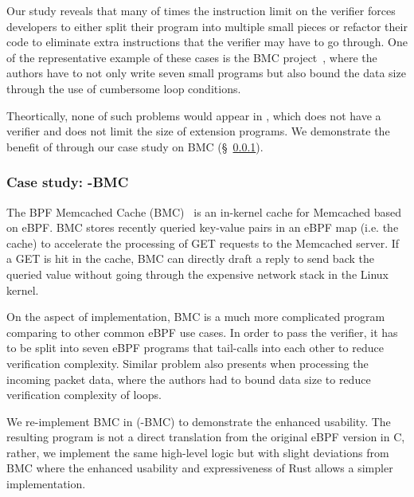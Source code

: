 Our study reveals that many of times the instruction limit on the verifier
    forces developers to either split their program into multiple small pieces
    or refactor their code to eliminate extra instructions that the verifier
    may have to go through.
One of the representative example of these cases is the BMC project~\cite{BMC},
    where the authors have to not only write seven small programs but also
    bound the data size through the use of cumbersome loop conditions.

Theortically, none of such problems would appear in \projname{}, which does not
    have a verifier and does not limit the size of extension programs.
We demonstrate the benefit of \projname{} through our case study on BMC
    (\S~\ref{eval:bmc-case-study}).

\subsubsection{Case study: \projname{}-BMC}
\label{eval:bmc-case-study}
The BPF Memcached Cache (BMC)~\cite{BMC} is an in-kernel cache for Memcached
    based on eBPF.
BMC stores recently queried key-value pairs in an eBPF map (i.e. the cache) to
    accelerate the processing of GET requests to the Memcached server.
If a GET is hit in the cache, BMC can directly draft a reply to send back the
    queried value without going through the expensive network stack in the
    Linux kernel.

On the aspect of implementation, BMC is a much more complicated program
    comparing to other common eBPF use cases.
In order to pass the verifier, it has to be split into seven
    eBPF programs that tail-calls into each other to reduce verification
    complexity.
Similar problem also presents when processing the incoming packet data, where
    the authors had to bound data size to reduce verification complexity of
    loops.

We re-implement BMC in \projname{} (\projname{}-BMC) to demonstrate the
    enhanced usability.
The resulting program is not a direct translation from the original eBPF
    version in C, rather, we implement the same high-level logic but with
    slight deviations from BMC where the enhanced usability and expressiveness
    of Rust allows a simpler implementation.


